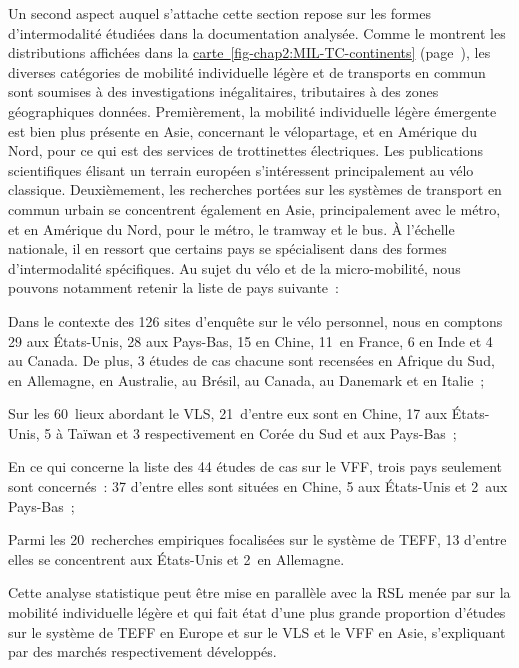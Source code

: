 \begin{refsegment}
Un second aspect auquel s'attache cette section repose sur les formes d'intermodalité étudiées dans la documentation analysée. Comme le montrent les distributions affichées dans la \hyperref[fig-chap2:MIL-TC-continents]{carte~\ref{fig-chap2:MIL-TC-continents}} (page~\pageref{fig-chap2:MIL-TC-continents}), les diverses catégories de mobilité individuelle légère et de transports en commun sont soumises à des investigations inégalitaires, tributaires à des zones géographiques données. Premièrement, la mobilité individuelle légère émergente est bien plus présente en Asie, concernant le vélopartage, et en Amérique du Nord, pour ce qui est des services de trottinettes électriques. Les publications scientifiques élisant un terrain européen s'intéressent principalement au vélo classique. Deuxièmement, les recherches portées sur les systèmes de transport en commun urbain se concentrent également en Asie, principalement avec le métro, et en Amérique du Nord, pour le métro, le tramway et le bus. À l'échelle nationale, il en ressort que certains pays se spécialisent dans des formes d'intermodalité spécifiques. Au sujet du vélo et de la micro-mobilité, nous pouvons notamment retenir la liste de pays suivante~:
    \begin{customitemize}
        \item Dans le contexte des 126 sites d'enquête sur le vélo personnel, nous en comptons 29 aux États-Unis, 28 aux Pays-Bas, 15 en Chine, 11~en France, 6 en Inde et 4 au Canada. De plus, 3 études de cas chacune sont recensées en Afrique du Sud, en Allemagne, en Australie, au Brésil, au Canada, au Danemark et en Italie~;
        \item Sur les 60~lieux abordant le \acrshort{VLS}, 21~d'entre eux sont en Chine, 17 aux États-Unis, 5 à Taïwan et 3 respectivement en Corée du Sud et aux Pays-Bas~;
        \item En ce qui concerne la liste des 44 études de cas sur le \acrshort{VFF}, trois pays seulement sont concernés~: 37 d'entre elles sont situées en Chine, 5 aux États-Unis et 2~aux Pays-Bas~;
        \item Parmi les 20~recherches empiriques focalisées sur le système de \acrshort{TEFF}, 13 d'entre elles se concentrent aux États-Unis et 2~en Allemagne.
    \end{customitemize}
Cette analyse statistique peut être mise en parallèle avec la \acrshort{RSL} menée par \textcolor{blue}{\textcite[298]{zhang_built_2023}} sur la mobilité individuelle légère et qui fait état d'une plus grande proportion d'études sur le système de \acrshort{TEFF} en Europe et sur le \acrshort{VLS} et le \acrshort{VFF} en Asie, s'expliquant par des marchés respectivement développés.%


\end{refsegment}
